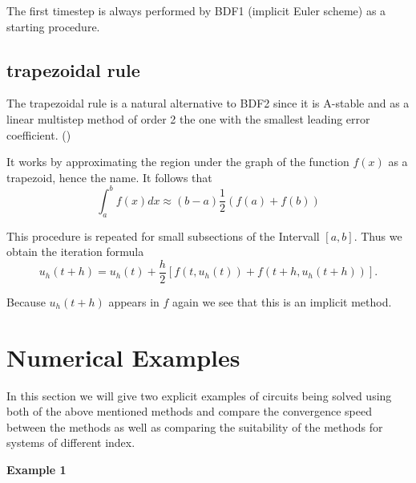 	The first timestep is always performed by BDF1 (implicit Euler scheme) as a starting procedure.
	
	
\subsection{trapezoidal rule}

	The trapezoidal rule is a natural alternative to BDF2 since it is A-stable and as a linear multistep method of order 2 the one with the smallest leading error coefficient. (\cite{ModellingAndDiscretizationOfCircuitProblems})
	
	It works by approximating the region under the graph of the function $f(x)$ as a trapezoid, hence the name. It follows that	
	\begin{displaymath}
		\int_{a}^{b} f(x) dx \approx (b-a)\frac{1}{2} (f(a)+f(b))
	\end{displaymath}
	
	This procedure is repeated for small subsections of the Intervall $[a,b]$. Thus we obtain the iteration formula
	\begin{displaymath}
		u_h (t+h) = u_h(t) +\frac{h}{2}[f(t,u_h(t)) + f(t+h, u_h(t+h))].
	\end{displaymath}
%	
	
	Because $u_h(t+h)$ appears in $f$ again we see that this is an implicit method. %
	
\section{Numerical Examples}
	
	In this section we will give two explicit examples of circuits being solved using both of the above mentioned methods and compare the convergence speed between the methods as well as comparing the suitability of the methods for systems of different index.
	
	\textbf{Example 1} \\
		
